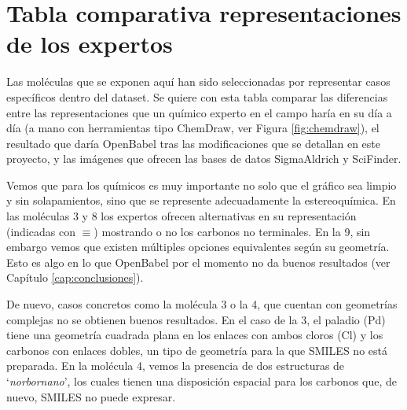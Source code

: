 \chapter{Tabla comparativa representaciones de los expertos}
\label{apend:expertos_dibujos}

Las moléculas que se exponen aquí han sido seleccionadas por representar casos específicos dentro del dataset. Se quiere con esta tabla comparar las diferencias entre las representaciones que un químico experto en el campo haría en su día a día (a mano con herramientas tipo ChemDraw, ver Figura \ref{fig:chemdraw}), el resultado que daría OpenBabel tras las modificaciones que se detallan en este proyecto, y las imágenes que ofrecen las bases de datos SigmaAldrich y SciFinder.

Vemos que para los químicos es muy importante no solo que el gráfico sea limpio y sin solapamientos, sino que se represente adecuadamente la estereoquímica. En las moléculas 3 y 8 los expertos ofrecen alternativas en su representación (indicadas con $\equiv$) mostrando o no los carbonos no terminales. En la 9, sin embargo vemos que existen múltiples opciones equivalentes según su geometría. Esto es algo en lo que OpenBabel por el momento no da buenos resultados (ver Capítulo \ref{cap:conclusiones}).

De nuevo, casos concretos como la molécula 3 o la 4, que cuentan con geometrías complejas no se obtienen buenos resultados. En el caso de la 3, el paladio (Pd) tiene una geometría cuadrada plana en los enlaces con ambos cloros (Cl) y los carbonos con enlaces dobles, un tipo de geometría para la que SMILES no está preparada. En la molécula 4, vemos la presencia de dos estructuras de `\textit{norbornano}', los cuales tienen una disposición espacial para los carbonos que, de nuevo, SMILES no puede expresar.



